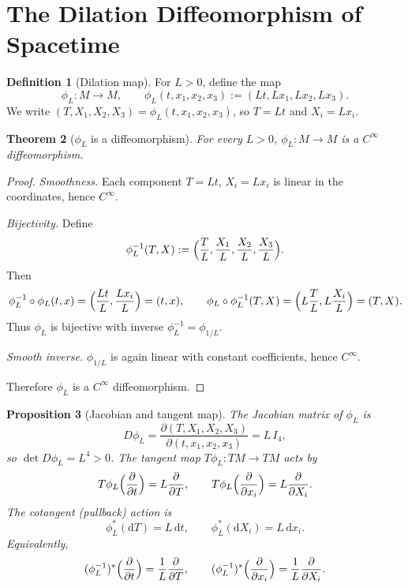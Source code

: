 \documentclass[11pt]{article}
\newtheorem{theorem}{Theorem}[section]
\newtheorem{proposition}[theorem]{Proposition}
\theoremstyle{definition}
\newtheorem{definition}[theorem]{Definition}
\theoremstyle{remark}
\newcommand{\diff}{\mathrm{d}}
\begin{document}
\section{The Dilation Diffeomorphism of Spacetime}
\label{sec:dilation}

\begin{definition}[Dilation map]
For $L>0$, define the map
\[
\phi_L:M\to M,\qquad \phi_L(t,x_1,x_2,x_3):=(Lt,Lx_1,Lx_2,Lx_3).
\]
We write $(T,X_1,X_2,X_3)=\phi_L(t,x_1,x_2,x_3)$, so $T=Lt$ and $X_i=Lx_i$.
\end{definition}

\begin{theorem}[$\phi_L$ is a diffeomorphism]
\label{thm:diffeo}
For every $L>0$, $\phi_L:M\to M$ is a $C^\infty$ diffeomorphism.
\end{theorem}

\begin{proof}
\emph{Smoothness.}  Each component $T=Lt$, $X_i=Lx_i$ is linear in the
coordinates, hence $C^\infty$.

\emph{Bijectivity.}  Define
\[
\phi_L^{-1}(T,X):=\Bigl(\frac{T}{L},\frac{X_1}{L},\frac{X_2}{L},\frac{X_3}{L}\Bigr).
\]
Then
\[
\phi_L^{-1}\circ\phi_L(t,x)=\Bigl(\frac{Lt}{L},\frac{Lx_i}{L}\Bigr)=(t,x),
\qquad
\phi_L\circ\phi_L^{-1}(T,X)=\Bigl(L\frac{T}{L},L\frac{X_i}{L}\Bigr)=(T,X).
\]
Thus $\phi_L$ is bijective with inverse $\phi_L^{-1}=\phi_{1/L}$.

\emph{Smooth inverse.}  $\phi_{1/L}$ is again linear with constant
coefficients, hence $C^\infty$.

Therefore $\phi_L$ is a $C^\infty$ diffeomorphism.
\end{proof}

\begin{proposition}[Jacobian and tangent map]
\label{prop:jacobian}
The Jacobian matrix of $\phi_L$ is
\[
D\phi_L=\frac{\partial(T,X_1,X_2,X_3)}{\partial(t,x_1,x_2,x_3)}
=L\,I_4,
\]
so $\det D\phi_L=L^4>0$.  The tangent map
$T\phi_L:TM\to TM$ acts by
\[
T\phi_L\Bigl(\frac{\partial}{\partial t}\Bigr)
=L\frac{\partial}{\partial T},\qquad
T\phi_L\Bigl(\frac{\partial}{\partial x_i}\Bigr)
=L\frac{\partial}{\partial X_i}.
\]
The cotangent (pullback) action is
\[
\phi_L^*(\diff T)=L\,\diff t,\qquad
\phi_L^*(\diff X_i)=L\,\diff x_i.
\]
Equivalently,
\[
(\phi_L^{-1})^*\Bigl(\frac{\partial}{\partial t}\Bigr)
=\frac{1}{L}\frac{\partial}{\partial T},\qquad
(\phi_L^{-1})^*\Bigl(\frac{\partial}{\partial x_i}\Bigr)
=\frac{1}{L}\frac{\partial}{\partial X_i}.
\]
\end{proposition}
\end{document}
